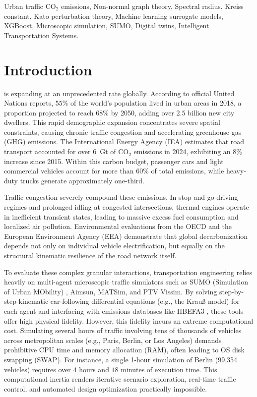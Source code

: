 \documentclass[lettersize,journal]{IEEEtran}
\begin{document}
\begin{IEEEkeywords}
Urban traffic $\text{CO}_2$ emissions, Non-normal graph theory, Spectral radius, Kreiss constant, Kato perturbation theory, Machine learning surrogate models, XGBoost, Microscopic simulation, SUMO, Digital twins, Intelligent Transportation Systems.
\end{IEEEkeywords}

\section{Introduction}
 is expanding at an unprecedented rate globally. According to official United Nations reports, $55\%$ of the world's population lived in urban areas in 2018, a proportion projected to reach $68\%$ by 2050, adding over 2.5 billion new city dwellers. This rapid demographic expansion concentrates severe spatial constraints, causing chronic traffic congestion and accelerating greenhouse gas (GHG) emissions. The International Energy Agency (IEA) estimates that road transport accounted for over $6$~Gt of $\text{CO}_2$ emissions in 2024, exhibiting an $8\%$ increase since 2015. Within this carbon budget, passenger cars and light commercial vehicles account for more than $60\%$ of total emissions, while heavy-duty trucks generate approximately one-third.

Traffic congestion severely compound these emissions. In stop-and-go driving regimes and prolonged idling at congested intersections, thermal engines operate in inefficient transient states, leading to massive excess fuel consumption and localized air pollution. Environmental evaluations from the OECD and the European Environment Agency (EEA) demonstrate that global decarbonization depends not only on individual vehicle electrification, but equally on the structural kinematic resilience of the road network itself.

To evaluate these complex granular interactions, transportation engineering relies heavily on multi-agent microscopic traffic simulators such as SUMO (Simulation of Urban MObility) \cite{Krajzewicz2012}, Aimsun, MATSim, and PTV Vissim. By solving step-by-step kinematic car-following differential equations (e.g., the Krauß model) for each agent and interfacing with emissions databases like HBEFA3 \cite{Kratzsch2020}, these tools offer high physical fidelity. However, this fidelity incurs an extreme computational cost. Simulating several hours of traffic involving tens of thousands of vehicles across metropolitan scales (e.g., Paris, Berlin, or Los Angeles) demands prohibitive CPU time and memory allocation (RAM), often leading to OS disk swapping (SWAP). For instance, a single 1-hour simulation of Berlin (99,354 vehicles) requires over $4$ hours and $18$ minutes of execution time. This computational inertia renders iterative scenario exploration, real-time traffic control, and automated design optimization practically impossible.
\end{document}
